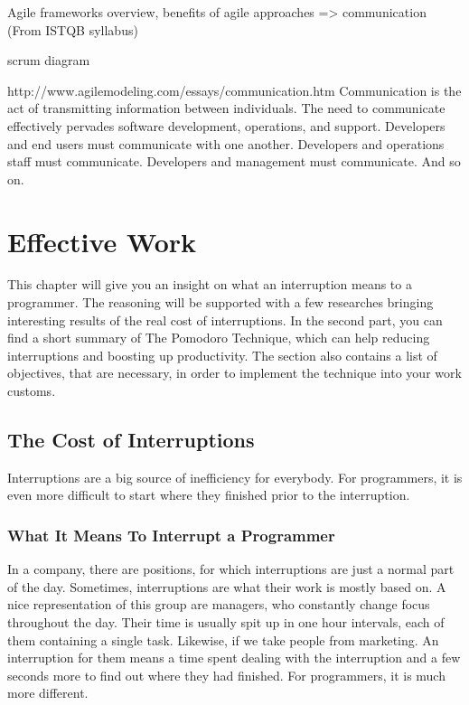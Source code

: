 \documentclass[11pt,singleside]{myfithesis2}
\begin{document}
Agile frameworks overview, benefits of agile approaches => communication (From ISTQB syllabus)

scrum diagram

http://www.agilemodeling.com/essays/communication.htm
Communication is the act of transmitting information between individuals. The need to communicate effectively pervades software development, operations, and support. Developers and end users must communicate with one another. Developers and operations staff must communicate. Developers and management must communicate. And so on.




\chapter{Effective Work}

This chapter will give you an insight on what an interruption means to a programmer. The reasoning will be supported with a few researches bringing interesting results of the real cost of interruptions. In the second part, you can find a short summary of The Pomodoro Technique, which can help reducing interruptions and boosting up productivity. The section also contains a list of objectives, that are necessary, in order to implement the technique into your work customs.

	\section{The Cost of Interruptions}
Interruptions are a big source of inefficiency for everybody. For programmers, it is even more difficult to start where they finished prior to the interruption.

		\subsection{What It Means To Interrupt a Programmer}
In a company, there are positions, for which interruptions are just a normal part of the day. Sometimes, interruptions are what their work is mostly based on. A nice representation of this group are managers, who constantly change focus throughout the day. Their time is usually spit up in one hour intervals, each of them containing a single task. Likewise, if we take people from marketing. An interruption for them means a time spent dealing with the interruption and a few seconds more to find out where they had finished. For programmers, it is much more different.
\end{document}
